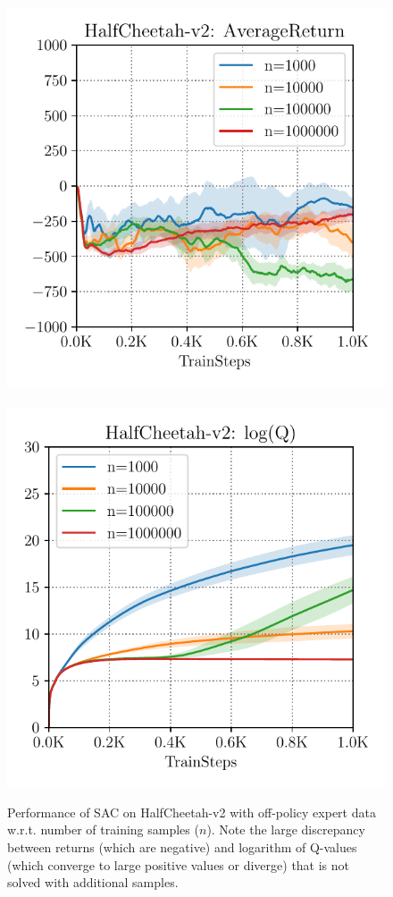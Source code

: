 \begin{figure}
\vspace{-10pt}
\begin{center}
    \includegraphics[width=0.48\linewidth]{images/cheetah_divergence.pdf}
    ~
    \includegraphics[width=0.48\linewidth]{images/cheetah_divergence_q_val.pdf}
  \end{center}
 \vspace{-10pt}
  \caption{Performance of SAC on HalfCheetah-v2 with off-policy expert data w.r.t. number of training samples ($n$). Note the large discrepancy between returns (which are negative) and logarithm of Q-values (which converge to large positive values or diverge) that is not solved with additional samples.} 
 \vspace{-15pt}
 \label{fig:divergence}
\end{figure}

